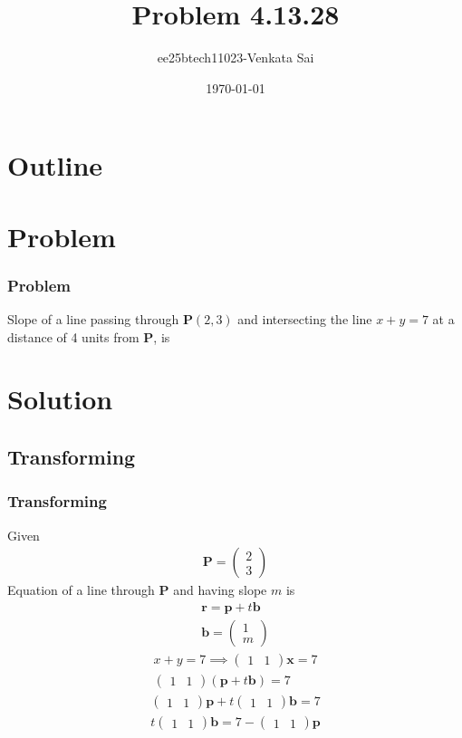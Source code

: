 \documentclass{beamer}
\title{Problem 4.13.28}
\author{ee25btech11023-Venkata Sai}
\date{\today}
\providecommand{\brak}[1]{\ensuremath{\left(#1\right)}}
\theoremstyle{remark}
\newcommand{\myvec}[1]{\ensuremath{\begin{pmatrix}#1\end{pmatrix}}}
\let\vec\mathbf
\numberwithin{equation}{section}
\begin{document}
\begin{frame}
\titlepage
\end{frame}

\section*{Outline}
\begin{frame}
\tableofcontents
\end{frame}

\section{Problem}

\begin{frame}
\frametitle{Problem}
\setcounter{section}{1}
Slope of a line passing through $\vec{P}\brak{2,3}$ and intersecting the line $x+y=7$ at a distance of 4 units from $\vec{P}$, is
\end{frame}
\section{Solution}

\subsection{Transforming}
\begin{frame}
\frametitle{Transforming}
Given  
\begin{align}
\vec{P}=\myvec{2\\3}
\end{align}
Equation of a line through $\vec{P}$ and having slope $m$ is
\begin{align}
\vec{r}=\vec{p}+t\vec{b} \\
\vec{b}=\myvec{1\\m}
 \end{align}
\begin{align}
  x+y=7 \implies  \myvec{1 & 1}\vec{x}=7 \\
  \myvec{1&1}\brak{\vec{p}+t\vec{b}}=7
\end{align}
\begin{align}
\myvec{1&1}\vec{p}+t\myvec{1&1}\vec{b} = 7\\
t\myvec{1&1}\vec{b} =7-\myvec{1&1}\vec{p} 
\end{align}
\end{frame}
\end{document}
